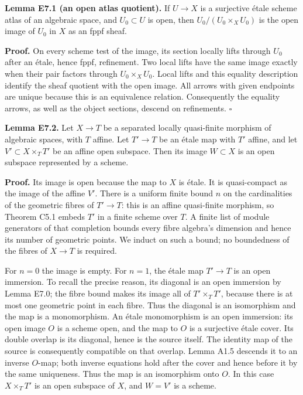 \documentclass[11pt,a4paper,openany]{report}
\begin{document}
\textbf{Lemma E7.1 (an open atlas quotient).} If \(U\to X\) is a surjective étale scheme atlas of an algebraic space, and \(U_0\subset U\) is open, then \(U_0/(U_0\times_X U_0)\) is the open image of \(U_0\) in \(X\) as an fppf sheaf.

\textbf{Proof.} On every scheme test of the image, its section locally lifts through \(U_0\) after an étale, hence fppf, refinement. Two local lifts have the same image exactly when their pair factors through \(U_0\times_X U_0\). Local lifts and this equality description identify the sheaf quotient with the open image. All arrows with given endpoints are unique because this is an equivalence relation. Consequently the equality arrows, as well as the object sections, descend on refinements. \(\square\)

\textbf{Lemma E7.2.} Let \(X\to T\) be a separated locally quasi-finite morphism of algebraic spaces, with \(T\) affine. Let \(T'\to T\) be an étale map with \(T'\) affine, and let \(V'\subset X\times_T T'\) be an affine open subspace. Then its image \(W\subset X\) is an open subspace represented by a scheme.

\textbf{Proof.} Its image is open because the map to \(X\) is étale. It is quasi-compact as the image of the affine \(V'\). There is a uniform finite bound \(n\) on the cardinalities of the geometric fibres of \(T'\to T\): this is an affine quasi-finite morphism, so Theorem C5.1 embeds \(T'\) in a finite scheme over \(T\). A finite list of module generators of that completion bounds every fibre algebra's dimension and hence its number of geometric points. We induct on such a bound; no boundedness of the fibres of \(X\to T\) is required.

For \(n=0\) the image is empty. For \(n=1\), the étale map \(T'\to T\) is an open immersion. To recall the precise reason, its diagonal is an open immersion by Lemma E7.0; the fibre bound makes its image all of \(T'\times_T T'\), because there is at most one geometric point in each fibre. Thus the diagonal is an isomorphism and the map is a monomorphism. An étale monomorphism is an open immersion: its open image \(O\) is a scheme open, and the map to \(O\) is a surjective étale cover. Its double overlap is its diagonal, hence is the source itself. The identity map of the source is consequently compatible on that overlap. Lemma A1.5 descends it to an inverse \(O\)-map; both inverse equations hold after the cover and hence before it by the same uniqueness. Thus the map is an isomorphism onto \(O\). In this case \(X\times_T T'\) is an open subspace of \(X\), and \(W=V'\) is a scheme.
\end{document}
